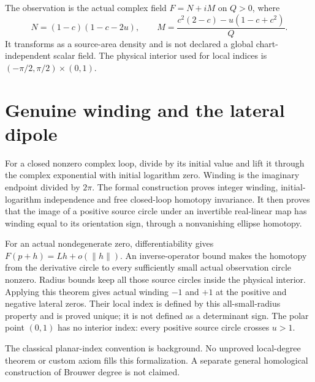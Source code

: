 \documentclass[11pt,a4paper]{article}
\begin{document}
The observation is the actual complex field $F=N+iM$ on $Q>0$, where
\[
 N=(1-c)(1-c-2u),\qquad M=\frac{c^2(2-c)-u(1-c+c^2)}Q.
\]
It transforms as a source-area density and is not declared a global
chart-independent scalar field. The physical interior used for local
indices is $(-\pi/2,\pi/2)\times(0,1)$.

\section{Genuine winding and the lateral dipole}
For a closed nonzero complex loop, divide by its initial value and lift
it through the complex exponential with initial logarithm zero. Winding
is the imaginary endpoint divided by $2\pi$. The formal construction
proves integer winding, initial-logarithm independence and free closed-loop
homotopy invariance. It then proves that the image of a positive source
circle under an invertible real-linear map has winding equal to its
orientation sign, through a nonvanishing ellipse homotopy.

For an actual nondegenerate zero, differentiability gives
$F(p+h)=Lh+o(\lVert h\rVert)$. An inverse-operator bound makes the
homotopy from the derivative circle to every sufficiently small actual
observation circle nonzero. Radius bounds keep all those source circles
inside the physical interior. Applying this theorem gives actual winding
$-1$ and $+1$ at the positive and negative lateral zeros. Their local
index is defined by this all-small-radius property and is proved unique;
it is not defined as a determinant sign. The polar point $(0,1)$ has no
interior index: every positive source circle crosses $u>1$.

The classical planar-index convention is background. No unproved
local-degree theorem or custom axiom fills this formalization. A separate
general homological construction of Brouwer degree is not claimed.
\end{document}
